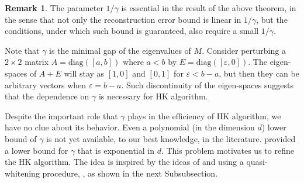 \documentclass[twoside]{article}
\theoremstyle{definition}
\newtheorem{remark}[lemma]{Remark}
\newcommand{\eps}{\varepsilon}
\begin{document}
\begin{remark}
The parameter $1/\gamma$ is essential in the result of the above theorem, in the sense that not only the reconstruction error bound is linear in $1/\gamma$, but the conditions, under which such bound is guaranteed, also require a small $1/\gamma$.

Note that $\gamma$ is the minimal gap of the eigenvalues of $M$.
Consider perturbing a $2\times 2$ matrix $A = \text{diag}([a,b])$ where $a<b$ by $E = \text{diag}([\eps,0])$. 
The eigen-spaces of $A+E$ will stay as $[1,0]$ and $[0,1]$ for $\eps < b-a$, but then they can be arbitrary vectors when $\eps = b-a$.  
Such discontinuity of the eigen-spaces suggests that the dependence on $\gamma$ is necessary for HK algorithm. 

Despite the important role that $\gamma$ plays in the efficiency of HK algorithm, we have no clue about its behavior. 
Even a polynomial (in the dimension $d$) lower bound of $\gamma$ is not yet available, to our best knowledge, in the literature. 
\citet{goyal2014fourier} provided a lower bound for $\gamma$ that is exponential in $d$.
This problem motivates us to refine the HK algorithm.
The idea is inspired by the ideas of \citep{arora2012provable} and \citep{frieze1996learning} using a quasi-whitening procedure, , as shown in the next Subsubsection.
\end{remark}
\end{document}
